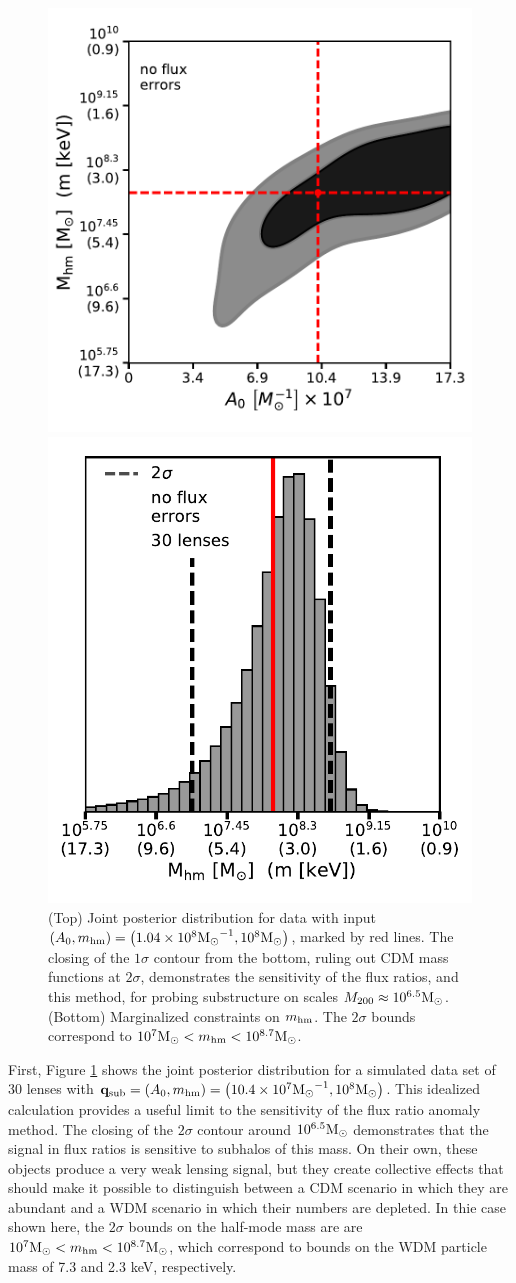 \begin{figure}
	\centerline{
		\includegraphics[clip,trim=0cm .5cm 0cm
		0cm,width=.48\textwidth,keepaspectratio]{./figures_ABCforward/joint_30_0025_8_noerrors.pdf}
	}
	\centerline{
		\includegraphics[clip,trim=0cm 0cm 0cm
		0cm,width=.45\textwidth,keepaspectratio]{./figures_ABCforward/marginal_mhm_30lens_0025_8.pdf}
	}
	\caption{\label{fig:wdm_inf_noerror}
		(Top) Joint posterior distribution for data with input $\left(A_0,m_{\rm{hm}}\right) = \left(1.04\times 10^8 {\rm{M}_{\odot}}^{-1},10^8 {\rm{M}_{\odot}} \right)$, marked by red lines. The closing of the $1\sigma$ contour from the bottom, ruling out CDM mass functions at $2\sigma$, demonstrates the sensitivity of the flux ratios, and this method, for probing substructure on scales $M_{200} \approx 10^{6.5} {\rm{M}_{\odot}}$.
		(Bottom) Marginalized constraints on $m_{\rm{hm}}$.  The $2 \sigma$ bounds correspond to $10^{7} {\rm{M}_{\odot}} < m_{\rm{hm}} < 10^{8.7} {\rm{M}_{\odot}}$.}
\end{figure}

First, Figure \ref{fig:wdm_inf_noerror} shows the joint posterior distribution for a simulated data set of 30 lenses with ${\bf{q}_{\rm{sub}}} = \left(A_0,m_{\rm{hm}}\right) = \left(10.4 \times 10^7 {\rm{M}_{\odot}}^{-1},10^8 {\rm{M}_{\odot}} \right)$. This idealized calculation provides a useful limit to the sensitivity of the flux ratio anomaly method. The closing of the $2\sigma$ contour around $10^{6.5} {\rm{M}_{\odot}}$ demonstrates that the signal in flux ratios is sensitive to subhalos of this mass. On their own, these objects produce a very weak lensing signal, but they create collective effects that should make it possible to distinguish between a CDM scenario in which they are abundant and a WDM scenario in which their numbers are depleted.  In thie case shown here, the $2 \sigma$ bounds on the half-mode mass are are $10^{7} {\rm{M}_{\odot}} < m_{\rm{hm}} < 10^{8.7} {\rm{M}_{\odot}}$, which correspond to bounds on the WDM particle mass of 7.3 and 2.3 keV, respectively. 

